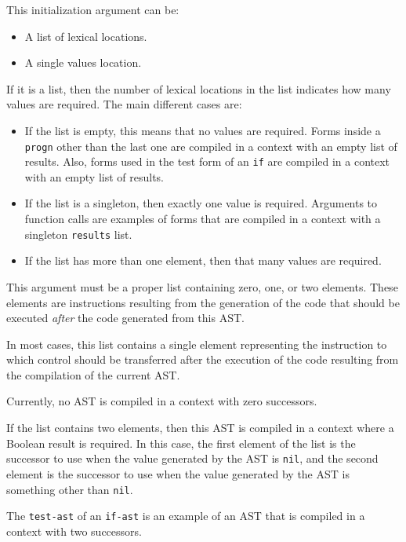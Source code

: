 
This initialization argument can be:

\begin{itemize}
\item A list of lexical locations.
\item A single values location.
\end{itemize}

If it is a list, then the number of lexical locations in the list
indicates how many values are required.  The main different cases are:

\begin{itemize}
\item If the list is empty, this means that no values are required.
  Forms inside a \texttt{progn} other than the last one are compiled
  in a context with an empty list of results.  Also, forms used in the
  test form of an \texttt{if} are compiled in a context with an empty
  list of results.
\item If the list is a singleton, then exactly one value is required.
  Arguments to function calls are examples of forms that are compiled
  in a context with a singleton \texttt{results} list.
\item If the list has more than one element, then that many values are
  required.
\end{itemize}


This argument must be a proper list containing zero, one, or two
elements.  These elements are instructions resulting from the
generation of the code that should be executed \emph{after} the code
generated from this AST.

In most cases, this list contains a single element representing the
instruction to which control should be transferred after the execution
of the code resulting from the compilation of the current AST.

Currently, no AST is compiled in a context with zero successors.

If the list contains two elements, then this AST is compiled in a
context where a Boolean result is required.  In this case, the first
element of the list is the successor to use when the value generated
by the AST is \texttt{nil}, and the second element is the successor to
use when the value generated by the AST is something other than
\texttt{nil}.

The \texttt{test-ast} of an \texttt{if-ast} is an example of an AST
that is compiled in a context with two successors.

